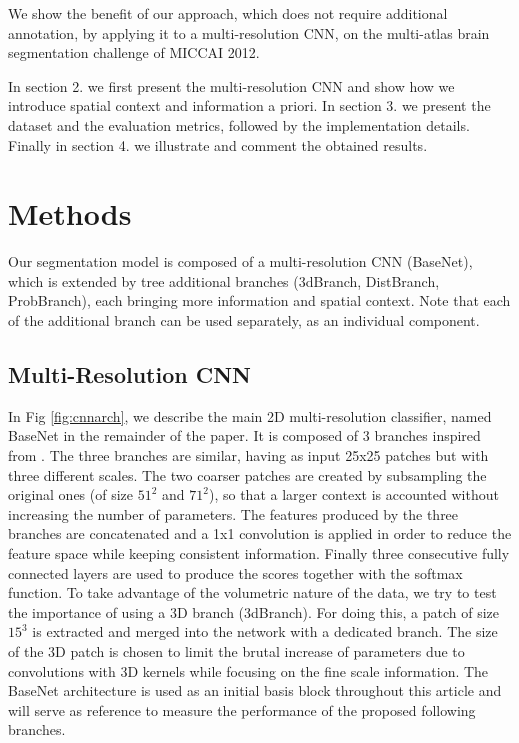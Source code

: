 \documentclass{article}
\begin{document}
We show the benefit of our approach, which does not require additional annotation, by applying it to a multi-resolution CNN, on the multi-atlas brain segmentation challenge of MICCAI 2012.

In section 2. we first present the multi-resolution CNN and show how we introduce spatial context and information a priori. In section 3. we present the dataset and the evaluation metrics, followed by the implementation details. Finally in section 4. we illustrate and comment the obtained results.

\section{Methods}
Our segmentation model is composed of a multi-resolution CNN (BaseNet), which is extended by tree additional branches (3dBranch, DistBranch, ProbBranch), each bringing more information and spatial context. 
Note that each of the additional branch can be used separately, as an individual component.

\subsection{Multi-Resolution CNN}
In Fig \ref{fig:cnnarch}, we describe the main 2D multi-resolution classifier, named BaseNet in the remainder of the paper. It is composed of 3 branches inspired from \cite{moeskops_automatic_2016, brebisson}.
The three branches are similar, having as input 25x25 patches but with three different scales. The two coarser patches are created by subsampling the original ones (of size $51^2$ and $71^2$), so that a larger context is accounted without increasing the number of parameters.
The features produced by the three branches are concatenated and a 1x1 convolution is applied in order to reduce the feature space while keeping consistent information. Finally three consecutive fully connected layers are used to produce the scores together with the softmax function. To take advantage of the volumetric nature of the data, we try to test the importance of using a 3D branch (3dBranch). For doing this, a patch of size $15^3$ is extracted and merged into the network with a dedicated branch. 
The size of the 3D patch is chosen to limit the brutal increase of parameters due to convolutions with 3D kernels while focusing on the fine scale information. \newline
The BaseNet architecture is used as an initial basis block throughout this article and will serve as reference to measure the performance of the proposed following branches.
\end{document}
